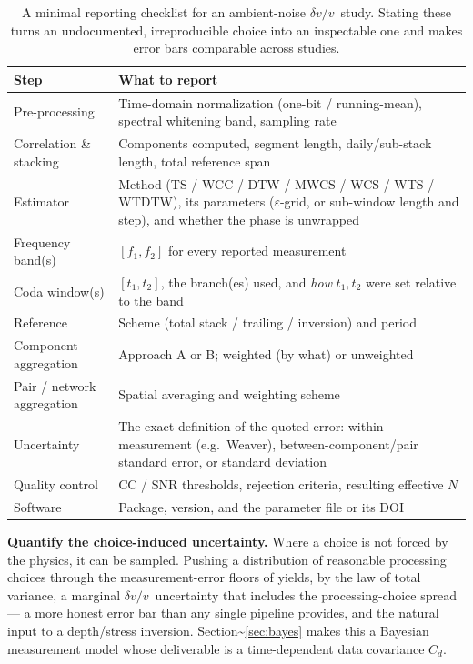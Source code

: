 \documentclass[
  11pt,
  letterpaper,
]{article}
\providecommand{\dvv}{\ensuremath{\delta v/v}}
\begin{document}
\begin{table}[htbp]
\footnotesize
\caption{A minimal reporting checklist for an ambient-noise \dvv\ study. Stating
these turns an undocumented, irreproducible choice into an inspectable one and
makes error bars comparable across studies.}
\label{tab:checklist}
\begin{tabularx}{\textwidth}{@{}>{\raggedright\arraybackslash}p{3.4cm} L@{}}
\toprule
\textbf{Step} & \textbf{What to report} \\
\midrule
Pre-processing & Time-domain normalization (one-bit / running-mean), spectral
whitening band, sampling rate \\ \hline
Correlation \& stacking & Components computed, segment length, daily/sub-stack
length, total reference span \\ \hline
Estimator & Method (TS / WCC / DTW / MWCS / WCS / WTS / WTDTW), its parameters
($\varepsilon$-grid, or sub-window length and step), and whether the phase is
unwrapped \\ \hline
Frequency band(s) & $[f_1,f_2]$ for every reported measurement \\ \hline
Coda window(s) & $[t_1,t_2]$, the branch(es) used, and \emph{how} $t_1,t_2$ were
set relative to the band \\ \hline
Reference & Scheme (total stack / trailing / inversion) and period \\ \hline
Component aggregation & Approach A or B; weighted (by what) or unweighted \\ \hline
Pair / network aggregation & Spatial averaging and weighting scheme \\ \hline
Uncertainty & The exact definition of the quoted error: within-measurement
(e.g.\ Weaver), between-component/pair standard error, or standard deviation \\ \hline
Quality control & CC / SNR thresholds, rejection criteria, resulting effective
$N$ \\ \hline
Software & Package, version, and the parameter file or its DOI \\
\bottomrule
\end{tabularx}
\end{table}

\textbf{Quantify the choice-induced uncertainty.} Where a choice is not
forced by the physics, it can be sampled. Pushing a distribution of
reasonable processing choices through the measurement-error floors of
\citeauthor{Clarke2011}
\citetext{\citeyear{Clarke2011}; \citealp{Weaver2011}} yields, by the
law of total variance, a marginal \dvv~uncertainty that includes the
processing-choice spread --- a more honest error bar than any single
pipeline provides, and the natural input to a depth/stress inversion.
Section\textasciitilde{}\ref{sec:bayes} makes this a Bayesian
measurement model whose deliverable is a time-dependent data covariance
\(C_d\).
\end{document}
